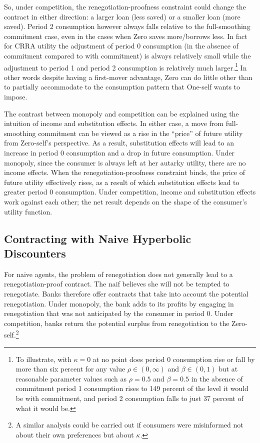 \documentclass[11pt,english]{article}
\theoremstyle{plain}
\theoremstyle{definition}
\begin{document}
So, under competition, the renegotiation-proofness constraint could
change the contract in either direction: a larger loan (less saved)
or a smaller loan (more saved). Period 2 consumption however always
falls relative to the full-smoothing commitment case, even in the
cases when Zero saves more/borrows less. In fact for CRRA utility
the adjustment of period 0 consumption (in the absence of commitment
compared to with commitment) is always relatively small while the
adjustment to period 1 and period 2 consumption is relatively much
larger.\footnote{To illustrate, with $\kappa=0$ at no point does period 0 consumption
rise or fall by more than six percent for any value $\rho\in(0,\infty)$
and $\beta\in(0,1)$ but at reasonable parameter values such as $\rho=0.5$
and $\beta=0.5$ in the absence of commitment period 1 consumption
rises to 149 percent of the level it would be with commitment, and
period 2 consumption falls to just 37 percent of what it would be.} In other words despite having a first-mover advantage, Zero can do
little other than to partially accommodate to the consumption pattern
that One-self wants to impose.

The contrast between monopoly and competition can be explained using
the intuition of income and substitution effects. In either case,
a move from full-smoothing commitment can
be viewed as a rise in the ``price'' of future utility from Zero-self's
perspective. As a result, substitution effects will lead to an increase
in period 0 consumption and a drop in future consumption. Under monopoly,
since the consumer is always left at her autarky utility, there are
no income effects. When the renegotiation-proofness constraint binds,
the price of future utility effectively rises, as a result of which
substitution effects lead to greater period 0 consumption. Under competition,
income and substitution effects work against each other; the net result
depends on the shape of the consumer's utility function.

\subsection{Contracting with Naive Hyperbolic Discounters}

For naive agents, the problem of renegotiation does not generally
lead to a renegotiation-proof contract. The naif believes she will
not be tempted to renegotiate. Banks therefore offer contracts that
take into account the potential renegotiation. Under monopoly, the
bank adds to its profits by engaging in renegotiation that was not
anticipated by the consumer in period 0. Under competition, banks
return the potential surplus from renegotiation to the Zero-self.\footnote{A similar analysis could be carried out if consumers were misinformed
not about their own preferences but about $\kappa$.}
\end{document}
